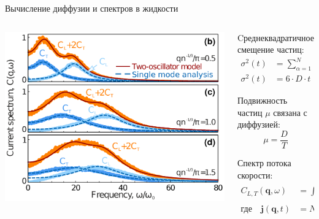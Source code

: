 \documentclass{beamer}
\begin{document}
\begin{frame}{Вычисление диффузии и спектров в жидкости}
\footnotesize{
\begin{columns}
\begin{column}{0.5\linewidth}
\begin{center}
    \includegraphics[width=\textwidth]{CFS-Figure1.png}
  \end{center}

\end{column}

\begin{column}{0.5\linewidth}


Cреднеквадратичное смещение частиц:
\begin{align}
    \sigma^2(t) &= \sum\limits_{\alpha = 1}^{N} (r_{\alpha}(t) - r_{\alpha}(0))^2 / N \\
    \sigma^2(t) &= 6\cdot D\cdot t
    \label{eqRMS}
\end{align}


Подвижность частиц $\mu$ связана с диффузией:
\begin{equation}
    \mu = \frac{D}{T}
    \label{eqMobility}
\end{equation}


Спектр потока скорости:
\begin{align}
    C_{L, T}(\mathbf{q}, \omega)&=\int dt e^{i \omega t} \text{Re} \left\langle\mathbf{j}_{L, T}(\mathbf{q}, t) \mathbf{j}_{L, T}(-\mathbf{q}, 0)\right\rangle \\
    \text{где} \quad \mathbf{j}(\mathbf{q}, t)&=N^{-1} \sum_{s} \mathbf{v}_{s}(t) \exp \left(i \mathbf{q} \mathbf{r}_{s}(t)\right)
\end{align}


\end{column}
\end{columns}}
\end{frame}
\end{document}
